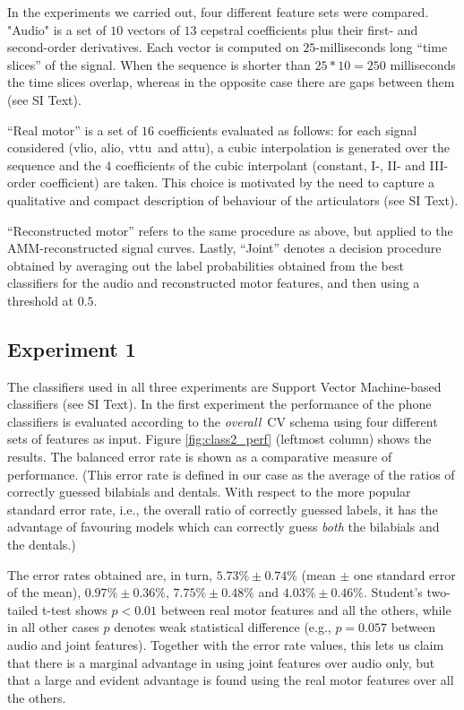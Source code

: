 \documentclass{pnastwo}
\newcommand{\vlio}{\textsf{vlio}}
\newcommand{\vttu}{\textsf{vttu}}
\newcommand{\alio}{\textsf{alio}}
\newcommand{\attu}{\textsf{attu}}
\newcommand{\overall}{\emph{overall}}
\begin{document}
\begin{article}
In the experiments we carried out, four different feature sets were compared. 
"Audio" is a set of $10$ vectors of $13$ cepstral coefficients plus their first- 
and second-order derivatives. Each vector is computed on $25$-milliseconds long 
``time slices'' of the signal. When the sequence is shorter than $25*10=250$ milliseconds
 the time slices overlap, whereas in the opposite case there are gaps between them (see SI Text).

``Real motor'' is a set of $16$ coefficients evaluated as follows: for each
signal considered (\vlio, \alio, \vttu\ and \attu), a cubic interpolation is generated over 
the sequence and the $4$ coefficients of the cubic interpolant (constant, I-, II- and III-order 
coefficient) are taken. This choice is motivated by the need to capture a qualitative and compact
description of behaviour of the articulators (see SI Text).

``Reconstructed motor'' refers to the same procedure as above, but applied
to the AMM-reconstructed signal curves.
Lastly, ``Joint'' denotes a decision procedure obtained by averaging out the
label probabilities obtained from the best classifiers for the audio and
reconstructed motor features, and then using a threshold at $0.5$.

\subsection{Experiment 1}
\label{subsec:exp1}

The classifiers used in all three experiments are Support Vector Machine-based classifiers 
\cite{BGV92} (see SI Text).
In the first experiment the performance of the phone classifiers is evaluated
according to the \overall\ CV schema using four different sets of features as
input. Figure \ref{fig:class2_perf} (leftmost column) shows the results. The balanced error rate
is shown as a comparative measure of performance. (This error rate is defined in
our case as the average of the ratios of correctly guessed bilabials and dentals.
With respect to the more popular standard error rate, i.e., the overall ratio of correctly
guessed labels, it has the advantage of favouring models which can correctly guess
\emph{both} the bilabials and the dentals.)

The error rates obtained are, in turn,
$5.73\% \pm 0.74\%$ (mean $\pm$ one standard error of the mean),
$0.97\% \pm 0.36\%$,
$7.75\% \pm 0.48\%$ and
$4.03\% \pm 0.46\%$. Student's two-tailed t-test shows $p<0.01$ between real motor features
and all the others, while in all other cases $p$ denotes weak statistical difference (e.g.,
$p=0.057$ between audio and joint features). Together with the error rate values, this lets
us claim that there is a marginal advantage in using joint features
over audio only, but that a large and evident advantage is found using the real motor features
over all the others.


\end{article}
\end{document}
